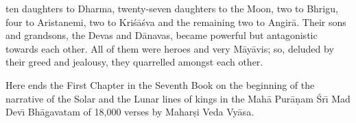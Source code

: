 ten daughters to Dharma, twenty-seven daughters to the Moon, two to Bhrigu, four to Aristanemi, two to Kri\'s\=a\'sva and the remaining two to Angir\=a. Their sons and grandsons, the Devas and D\=anavas, became powerful but antagonistic towards each other. All of them were heroes and very M\=ay\=avis; so, deluded by their greed and jealousy, they quarrelled amongst each other.

Here ends the First Chapter in the Seventh Book on the beginning of the narrative of the Solar and the Lunar lines of kings in the Mah\=a Pur\=a\d{n}am \'Sr\={\i} Mad Dev\={\i} Bh\=agavatam of 18,000 verses by Mahar\d{s}i Veda Vy\=asa.



